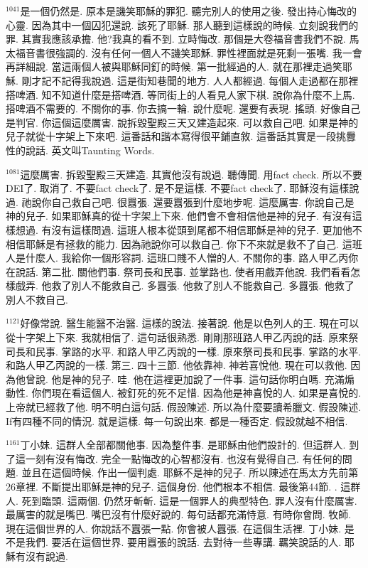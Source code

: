 \documentclass{book}
\begin{document}
$^{1041}$是一個仍然是.
原本是譏笑耶穌的罪犯.
聽完別人的使用之後.
發出持心悔改的心靈.
因為其中一個囚犯還說.
該死了耶穌.
那人聽到這樣說的時候.
立刻說我們的罪.
其實我應該承擔.
他?我真的看不到.
立時悔改.
那個是大卷福音書我們不說.
馬太福音書很強調的.
沒有任何一個人不譏笑耶穌.
罪性裡面就是死剩一張嘴.
我一會再詳細說.
當這兩個人被與耶穌同釘的時候.
第一批經過的人.
就在那裡走過笑耶穌.
剛才記不記得我說過.
這是街知巷聞的地方.
人人都經過.
每個人走過都在那裡搭啤酒.
知不知道什麼是搭啤酒.
等同街上的人看見人家下棋.
說你為什麼不上馬.
搭啤酒不需要的.
不關你的事.
你去搞一輪.
說什麼呢.
還要有表現.
搖頭.
好像自己是判官.
你這個這麼厲害.
說拆毀聖殿三天又建造起來.
可以救自己吧.
如果是神的兒子就從十字架上下來吧.
這番話和諧本寫得很平鋪直敘.
這番話其實是一段挑釁性的說話.
英文叫Taunting Words.

$^{1081}$這麼厲害.
拆毀聖殿三天建造.
其實他沒有說過.
聽傳聞.
用fact check.
所以不要DEI了.
取消了.
不要fact check了.
是不是這樣.
不要fact check了.
耶穌沒有這樣說過.
祂說你自己救自己吧.
很囂張.
還要囂張到什麼地步呢.
這麼厲害.
你說自己是神的兒子.
如果耶穌真的從十字架上下來.
他們會不會相信他是神的兒子.
有沒有這樣想過.
有沒有這樣問過.
這班人根本從頭到尾都不相信耶穌是神的兒子.
更加他不相信耶穌是有拯救的能力.
因為祂說你可以救自己.
你下不來就是救不了自己.
這班人是什麼人.
我給你一個形容詞.
這班口賤不人憎的人.
不關你的事.
路人甲乙丙你在說話.
第二批.
關他們事.
祭司長和民事.
並掌路也.
使者用戲弄他說.
我們看看怎樣戲弄.
他救了別人不能救自己.
多囂張.
他救了別人不能救自己.
多囂張.
他救了別人不救自己.

$^{1121}$好像常說.
醫生能醫不治醫.
這樣的說法.
接著說.
他是以色列人的王.
現在可以從十字架上下來.
我就相信了.
這句話很熟悉.
剛剛那班路人甲乙丙說的話.
原來祭司長和民事.
掌路的水平.
和路人甲乙丙說的一樣.
原來祭司長和民事.
掌路的水平.
和路人甲乙丙說的一樣.
第三.
四十三節.
他依靠神.
神若喜悅他.
現在可以救他.
因為他曾說.
他是神的兒子.
哇.
他在這裡更加說了一件事.
這句話你明白嗎.
充滿煽動性.
你們現在看這個人.
被釘死的死不足惜.
因為他是神喜悅的人.
如果是喜悅的.
上帝就已經救了他.
明不明白這句話.
假設陳述.
所以為什麼要讀希臘文.
假設陳述.
If有四種不同的情況.
就是這樣.
每一句說出來.
都是一種否定.
假設就越不相信.

$^{1161}$丁小妹.
這群人全部都關他事.
因為整件事.
是耶穌由他們設計的.
但這群人.
到了這一刻有沒有悔改.
完全一點悔改的心智都沒有.
也沒有覺得自己.
有任何的問題.
並且在這個時候.
作出一個判處.
耶穌不是神的兒子.
所以陳述在馬太方先前第26章裡.
不斷提出耶穌是神的兒子.
這個身份.
他們根本不相信.
最後第44節.
.
這群人.
死到臨頭.
這兩個.
仍然牙斬斬.
這是一個罪人的典型特色.
罪人沒有什麼厲害.
最厲害的就是嘴巴.
嘴巴沒有什麼好說的.
每句話都充滿恃意.
有時你會問.
牧師.
現在這個世界的人.
你說話不囂張一點.
你會被人囂張.
在這個生活裡.
丁小妹.
是不是我們.
要活在這個世界.
要用囂張的說話.
去對待一些專講.
羈笑說話的人.
耶穌有沒有說過.
\end{document}
